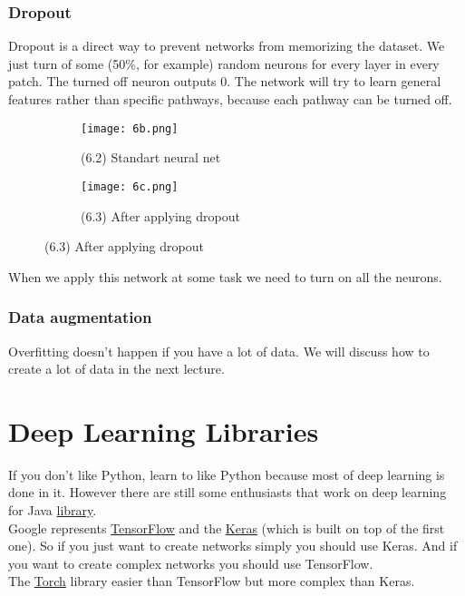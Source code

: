 \subsubsection*{Dropout}

Dropout is a direct way to prevent networks from memorizing the dataset. We just turn of some (50\%, for example) random neurons for every layer in every patch. The turned off neuron outputs 0. The network will try to learn general features rather than specific pathways, because each pathway can be turned off.\\
\begin{figure}[h!]
  \centering
  \begin{subfigure}[l]{0.3\linewidth}
    \texttt{[image: 6b.png]}
    \caption*{(6.2) Standart neural net}
  \end{subfigure}
  \hspace{2cm}
  \begin{subfigure}[r]{0.3\linewidth}
    \texttt{[image: 6c.png]}
    \caption*{(6.3) After applying dropout}
  \end{subfigure}
\end{figure}
When we apply this network at some task we need to turn on all the neurons.

\subsubsection*{Data augmentation}

Overfitting doesn't happen if you have a lot of data. We will discuss how to create a lot of data in the next lecture.

\section{Deep Learning Libraries}

If you don't like Python, learn to like Python because most of deep learning is done in it. However there are still some enthusiasts that work on deep learning for Java \href{http://deeplearning4j.org/}{library}.\\
Google represents \href{www.tensorflow.org}{TensorFlow} and the \href{keras.io}{Keras} (which is built on top of the first one). So if you just want to create networks simply you should use Keras. And if you want to create complex networks you should use TensorFlow.\\
The \href{torch.ch}{Torch} library easier than TensorFlow but more complex than Keras.